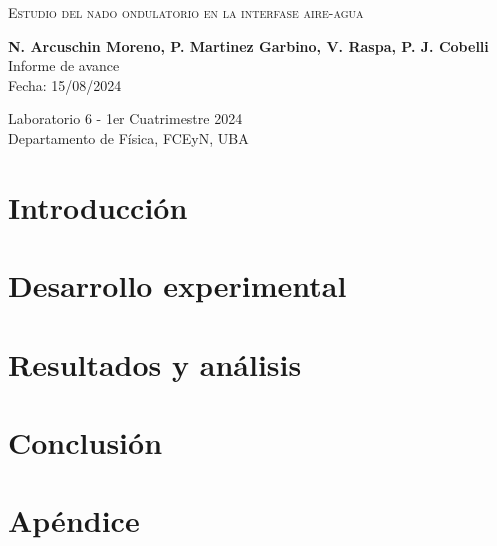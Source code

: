 \documentclass[]{article}
\begin{document}
\begin{center}																	
\vspace{1.5cm}
\textsc{\LARGE Estudio del nado ondulatorio en la interfase aire-agua}\\[1cm]

\noindent\hrulefill 
\vspace{0.5cm}


{ \large \bfseries N. Arcuschin Moreno, P. Martinez Garbino, V. Raspa, P. J. Cobelli}
\vspace{0.1cm}
\vspace{0.2cm}
{
    Informe de avance \\
    Fecha: 15/08/2024
}
\vspace{0.2cm}

Laboratorio 6 - 1er Cuatrimestre 2024\\
Departamento de Física, FCEyN, UBA
\end{center}

\vspace{0.5cm}

\noindent\hrulefill 
\vspace{0.5cm}
\renewcommand{\tablename}{Tabla}
\setcounter{footnote}{0}

\begin{multicols}{2}
\noindent

\section{Introducción}



\section{Desarrollo experimental}



\section{Resultados y análisis}



\section{Conclusión}



\vspace{-0.5em}

\printbibliography

\section*{Apéndice}


\end{multicols}
\end{document}
